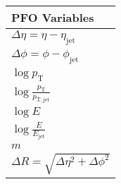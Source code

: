 \begin{table}[!htb]
    \centering
    \caption{}
    \label{tab:pfo_variables}
    \begin{tabular}{l}
    \toprule
        PFO Variables \\
    \midrule
        $\Delta \eta = \eta - \eta_\mathrm{jet}$ \\
        $\Delta \phi = \phi - \phi_\mathrm{jet}$ \\
        $\log{p_\mathrm{T}}$ \\
        $\log{\frac{p_\mathrm{T}}{p_\mathrm{T, jet}}}$ \\
        $\log{E}$ \\
        $\log{\frac{E}{E_\mathrm{jet}}}$ \\
        $m$ \\
        $\Delta R = \sqrt{\Delta \eta^2 + \Delta \phi^2}$ \\
    \bottomrule
    \end{tabular}
\end{table}
    